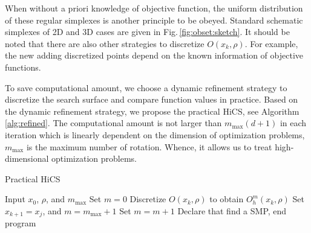 When without a priori knowledge of objective function, the
uniform distribution of these regular simplexes is another
principle to be obeyed.
Standard schematic simplexes of 2D and
3D cases are given in Fig.\,\ref{fig:obset:sketch}.
It should be noted that there are also other strategies to
discretize $O(x_k,\rho)$. 
For example, the new adding discretized points 
depend on the known information of objective functions. 

To save computational amount, we choose a dynamic refinement
strategy to discretize the search surface and compare function
values in practice. 
Based on the dynamic refinement strategy, we propose the
practical HiCS, see Algorithm \ref{alg:refined}. The computational amount is not
larger than $m_{\max}(d+1)$ in each iteration which is linearly
dependent on the dimension of optimization problems,
$m_{\max}$ is the maximum number of rotation.
Whence, it allows us to treat high-dimensional optimization problems.

\begin{algorithm}[H]
	\caption{Practical HiCS}
	\label{alg:refined}
\begin{algorithmic}[1]
	\STATE Input $x_0$, $\rho$, and $m_{\max}$
		\STATE Set $m=0$
			\STATE Discretize $O(x_k,\rho)$ to obtain $O^m_h(x_k,\rho)$
				\STATE Set $x_{k+1}=x_j$, and $m=m_{\max}+1$
			\ELSE
				\STATE Set $m = m+1$
			\ENDIF
		\ELSE
			\STATE Declare that find a SMP, end program
		\ENDIF
	\ENDFOR
\end{algorithmic}
\end{algorithm}


